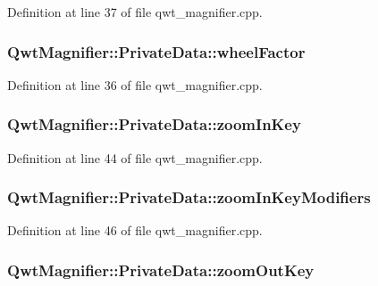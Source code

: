 Definition at line 37 of file qwt\-\_\-magnifier.\-cpp.

\hypertarget{class_qwt_magnifier_1_1_private_data_a387ddb4c328c08bff3206852533b5523}{
\subsubsection[{wheel\-Factor}]{ Qwt\-Magnifier\-::\-Private\-Data\-::wheel\-Factor}}\label{class_qwt_magnifier_1_1_private_data_a387ddb4c328c08bff3206852533b5523}


Definition at line 36 of file qwt\-\_\-magnifier.\-cpp.

\hypertarget{class_qwt_magnifier_1_1_private_data_ac2bc5bb7272e744f50bd0cd3338632e2}{
\subsubsection[{zoom\-In\-Key}]{ Qwt\-Magnifier\-::\-Private\-Data\-::zoom\-In\-Key}}\label{class_qwt_magnifier_1_1_private_data_ac2bc5bb7272e744f50bd0cd3338632e2}


Definition at line 44 of file qwt\-\_\-magnifier.\-cpp.

\hypertarget{class_qwt_magnifier_1_1_private_data_a7477d8863eff433d74bf3c7e3b7a2264}{
\subsubsection[{zoom\-In\-Key\-Modifiers}]{ Qwt\-Magnifier\-::\-Private\-Data\-::zoom\-In\-Key\-Modifiers}}\label{class_qwt_magnifier_1_1_private_data_a7477d8863eff433d74bf3c7e3b7a2264}


Definition at line 46 of file qwt\-\_\-magnifier.\-cpp.

\hypertarget{class_qwt_magnifier_1_1_private_data_a71d8b4520e4d0a8152342d26d3d64ffc}{
\subsubsection[{zoom\-Out\-Key}]{ Qwt\-Magnifier\-::\-Private\-Data\-::zoom\-Out\-Key}}\label{class_qwt_magnifier_1_1_private_data_a71d8b4520e4d0a8152342d26d3d64ffc}



